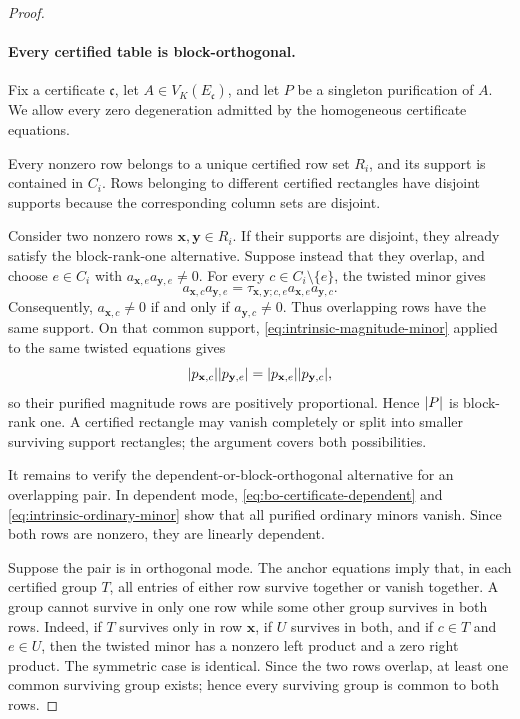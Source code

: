 \documentclass[11pt]{article}
\theoremstyle{plain}
\theoremstyle{definition}
\theoremstyle{remark}
\DeclarePairedDelimiter{\abs}{\lvert}{\rvert}
\begin{document}
\begin{proof}
\paragraph{Every certified table is block-orthogonal.}
Fix a certificate $\mathfrak c$, let
$A\in V_K(E_{\mathfrak c})$, and let $P$ be a singleton purification of
$A$.  We allow every zero degeneration admitted by the homogeneous
certificate equations.

Every nonzero row belongs to a unique certified row set $R_i$, and its
support is contained in $C_i$.  Rows belonging to different certified
rectangles have disjoint supports because the corresponding column sets are
disjoint.

Consider two nonzero rows $\mathbf x,\mathbf y\in R_i$.  If their supports
are disjoint, they already satisfy the block-rank-one alternative.  Suppose
instead that they overlap, and choose $e\in C_i$ with
$a_{\mathbf x,e}a_{\mathbf y,e}\ne0$.  For every $c\in C_i\setminus\{e\}$,
the twisted minor gives
\[
  a_{\mathbf x,c}a_{\mathbf y,e}
  =\tau_{\mathbf x,\mathbf y;c,e}
   a_{\mathbf x,e}a_{\mathbf y,c}.
\]
Consequently,
$a_{\mathbf x,c}\ne0$ if and only if $a_{\mathbf y,c}\ne0$.
Thus overlapping rows have the same support.  On that common support,
\eqref{eq:intrinsic-magnitude-minor} applied to the same twisted equations
gives
\[
  \abs{p_{\mathbf x,c}}\abs{p_{\mathbf y,e}}
  =\abs{p_{\mathbf x,e}}\abs{p_{\mathbf y,c}},
\]
so their purified magnitude rows are positively proportional.  Hence
$\abs P$ is block-rank one.  A certified rectangle may vanish completely or
split into smaller surviving support rectangles; the argument covers both
possibilities.

It remains to verify the dependent-or-block-orthogonal alternative for an
overlapping pair.  In dependent mode,
\eqref{eq:bo-certificate-dependent} and
\eqref{eq:intrinsic-ordinary-minor} show that all purified ordinary minors
vanish.  Since both rows are nonzero, they are linearly dependent.

Suppose the pair is in orthogonal mode.  The anchor equations imply that,
in each certified group $T$, all entries of either row survive together or
vanish together.  A group cannot survive in only one row while some other
group survives in both rows.  Indeed, if $T$ survives only in row
$\mathbf x$, if $U$ survives in both, and if $c\in T$ and $e\in U$, then the
twisted minor has a nonzero left product and a zero right product.  The
symmetric case is identical.  Since the two rows overlap, at least one
common surviving group exists; hence every surviving group is common to
both rows.


\end{proof}
\end{document}
